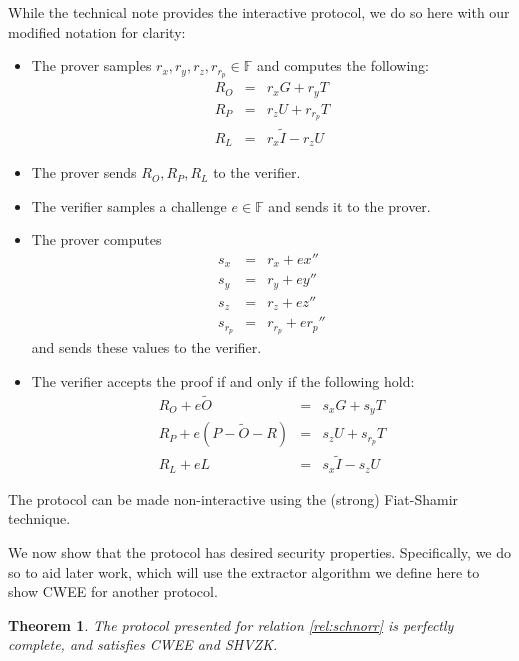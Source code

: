 \documentclass{article}
\newtheorem{theorem}{Theorem}
\theoremstyle{definition}
\newcommand{\FF}{\mathbb{F}}
\newcommand{\wt}[1]{\widetilde{#1}}
\begin{document}
While the technical note provides the interactive protocol, we do so here with our modified notation for clarity:
\begin{itemize}
	\item The prover samples $r_x, r_y, r_z, r_{r_p} \in \FF$ and computes the following:
	\begin{eqnarray*}
		R_O &=& r_x G + r_y T \\
		R_P &=& r_z U + r_{r_p} T \\
		R_L &=& r_x \wt{I} - r_z U
	\end{eqnarray*}
	\item The prover sends $R_O, R_P, R_L$ to the verifier.
	\item The verifier samples a challenge $e \in \FF$ and sends it to the prover.
	\item The prover computes
	\begin{eqnarray*}
		s_x &=& r_x + e x'' \\
		s_y &=& r_y + e y'' \\
		s_z &=& r_z + e z'' \\
		s_{r_p} &=& r_{r_p} + e r_p''
	\end{eqnarray*}
	and sends these values to the verifier.
	\item The verifier accepts the proof if and only if the following hold:
	\begin{eqnarray*}
		R_O + e \wt{O} &=& s_x G + s_y T \\
		R_P + e (P - \wt{O} - R) &=& s_z U + s_{r_p} T \\
		R_L + e L &=& s_x \wt{I} - s_z U
	\end{eqnarray*}
\end{itemize}

The protocol can be made non-interactive using the (strong) Fiat-Shamir technique.

We now show that the protocol has desired security properties.
Specifically, we do so to aid later work, which will use the extractor algorithm we define here to show CWEE for another protocol.

\begin{theorem}
	The protocol presented for relation \ref{rel:schnorr} is perfectly complete, and satisfies CWEE and SHVZK.
\end{theorem}
\end{document}
